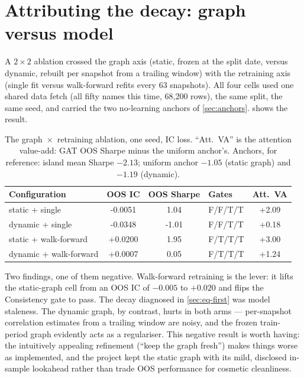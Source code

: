 \section{Attributing the decay: graph versus model}
\label{sec:eq-ablation}

A $2\times2$ ablation crossed the graph axis (static, frozen at the split
date, versus dynamic, rebuilt per snapshot from a trailing window) with
the retraining axis (single fit versus walk-forward refits every 63
snapshots). All four cells used one shared data fetch (all fifty names
this time, 68{,}200 rows), the same split, the same seed, and carried the
two no-learning anchors of \cref{sec:anchors}.
 shows the result.

\begin{table}[htbp]
  \centering
  \caption{The graph~$\times$~retraining ablation, one seed, IC loss.
  ``Att.\ VA'' is the attention value-add: GAT OOS Sharpe minus the
  uniform anchor's. Anchors, for reference: island mean Sharpe $-2.13$;
  uniform anchor $-1.05$ (static graph) and $-1.19$ (dynamic).}
  \label{tab:eq-ablation}
  \begin{tabular}{lS[table-format=-1.4,round-precision=4]S[table-format=-1.2,round-precision=2]lS[table-format=-1.2,round-precision=2]}
    \toprule
    Configuration & {OOS IC} & {OOS Sharpe} & Gates & {Att.\ VA} \\
    \midrule
    static + single       & -0.0051 &  1.04 & F/F/T/T & +2.09 \\
    dynamic + single      & -0.0348 & -1.01 & F/F/T/T & +0.18 \\
    static + walk-forward & +0.0200 &  1.95 & F/T/T/T & +3.00 \\
    dynamic + walk-forward& +0.0007 &  0.05 & F/T/T/T & +1.24 \\
    \bottomrule
  \end{tabular}
\end{table}

Two findings, one of them negative. Walk-forward retraining is the lever:
it lifts the static-graph cell from an OOS IC of $-0.005$ to $+0.020$ and
flips the Consistency gate to pass. The decay diagnosed in
\cref{sec:eq-first} was model staleness. The dynamic graph, by contrast,
hurts in both arms --- per-snapshot correlation estimates from a trailing
window are noisy, and the frozen train-period graph evidently acts as a
regulariser. This negative result is worth having: the intuitively
appealing refinement (``keep the graph fresh'') makes things worse as
implemented, and the project kept the static graph with its mild,
disclosed in-sample lookahead rather than trade OOS performance for
cosmetic cleanliness.

